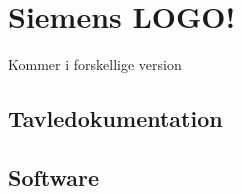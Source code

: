 \section{Siemens LOGO!}
Kommer i forskellige version
\subsection{Tavledokumentation}
\subsection{Software}
